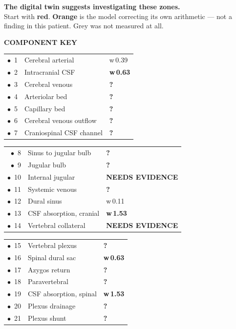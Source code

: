 \documentclass[9pt,a4paper]{extarticle}
\newcommand{\hdrbig}[2][]{%
  {\sffamily\bfseries\large\color{ink}\MakeUppercase{#2}}%
  {\sffamily\small\color{faint}\,#1}%
  \par\vspace{2pt}{\color{rule}\hrule height .9pt}\vspace{5pt}}
\newcommand{\Q}{{\bfseries\normalsize ?}}
\begin{document}
\vspace{7pt}
{\sffamily\bfseries\Large\color{ink} The digital twin suggests investigating these zones.
}\\[2pt]
{\sffamily\footnotesize\color{faint} Start with {\color{ccrit}\textbf{red}}. {\color{carte}\textbf{Orange}}
is the model correcting its own arithmetic --- not a finding in this patient. Grey was not
measured at all.}

\vspace{8pt}
\raggedright
\hdrbig{Component key}
{\normalsize
\begin{tabular}{@{}r@{~}l l@{}}
    {\color{cwarn}$\bullet$}~1 & Cerebral arterial & w\,0.39 \\
    {\color{ccrit}$\bullet$}~2 & Intracranial CSF & \textbf{w\,0.63} \\
    {\color{cunev}$\bullet$}~3 & Cerebral venous & \Q \\
    {\color{cunev}$\bullet$}~4 & Arteriolar bed & \Q \\
    {\color{cunev}$\bullet$}~5 & Capillary bed & \Q \\
    {\color{cunev}$\bullet$}~6 & Cerebral venous outflow & \Q \\
    {\color{cunev}$\bullet$}~7 & Craniospinal CSF channel & \Q\\
\end{tabular} \hfill
\begin{tabular}{@{}r@{~}l l@{}}
    {\color{cunev}$\bullet$}~8 & Sinus to jugular bulb & \Q \\
    {\color{cunev}$\bullet$}~9 & Jugular bulb & \Q \\
    {\color{carte}$\bullet$}~10 & Internal jugular & \textbf{NEEDS EVIDENCE} \\
    {\color{cunev}$\bullet$}~11 & Systemic venous & \Q \\
    {\color{csafe}$\bullet$}~12 & Dural sinus & w\,0.11 \\
    {\color{ccrit}$\bullet$}~13 & CSF absorption, cranial & \textbf{w\,1.53} \\
    {\color{carte}$\bullet$}~14 & Vertebral collateral & \textbf{NEEDS EVIDENCE}\\
\end{tabular} \hfill
\begin{tabular}{@{}r@{~}l l@{}}
    {\color{cunev}$\bullet$}~15 & Vertebral plexus & \Q \\
    {\color{ccrit}$\bullet$}~16 & Spinal dural sac & \textbf{w\,0.63} \\
    {\color{cunev}$\bullet$}~17 & Azygos return & \Q \\
    {\color{cunev}$\bullet$}~18 & Paravertebral & \Q \\
    {\color{ccrit}$\bullet$}~19 & CSF absorption, spinal & \textbf{w\,1.53} \\
    {\color{cunev}$\bullet$}~20 & Plexus drainage & \Q \\
    {\color{cunev}$\bullet$}~21 & Plexus shunt & \Q\\
\end{tabular}
\par}
\end{document}
